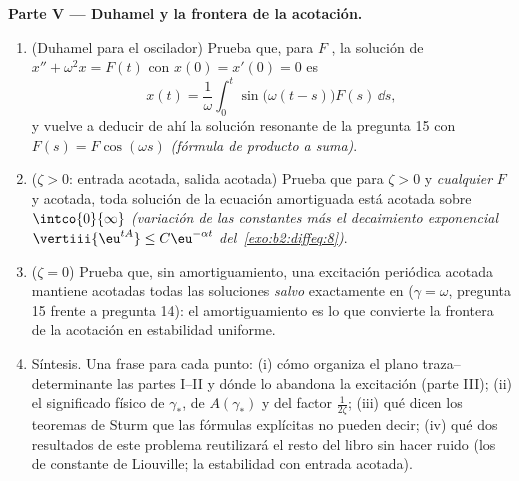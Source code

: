 \begin{problem}
\medskip
\noindent\textbf{Parte V --- Duhamel y la frontera de la
acotación.}
\begin{enumerate}[resume]
  \item (Duhamel para el oscilador) Prueba que, para $F$ ,
        la solución de $x'' + \omega^2x = F(t)$ con $x(0) = x'(0) =
        0$ es
        \[
        x(t) = \frac1\omega\int_0^t\sin\bigl(\omega(t -
        s)\bigr)F(s)\,\dd s ,
        \]
        y vuelve a deducir de ahí la solución resonante de la
        pregunta 15 con $F(s) = F\cos(\omega s)$ \emph{(fórmula de
        producto a suma)}.
  \item ($\zeta > 0$: entrada acotada, salida acotada) Prueba que
        para $\zeta > 0$ y \emph{cualquier} $F$  y acotada,
        toda solución de la ecuación amortiguada está acotada sobre
        $\intco{0}{\infty}$ \emph{(variación de las constantes más
        el decaimiento exponencial $\vertiii{\eu^{tA}} \leq
        C\eu^{-\alpha t}$ del~\cref{exo:b2:diffeq:8})}.
  \item ($\zeta = 0$) Prueba que, sin amortiguamiento, una
        excitación periódica acotada mantiene acotadas todas las
        soluciones \emph{salvo} exactamente en  ($\gamma =
        \omega$, pregunta 15 frente a pregunta 14): el
        amortiguamiento es lo que convierte la frontera de la
        acotación en estabilidad uniforme.
  \item Síntesis. Una frase para cada punto: (i) cómo organiza el
        plano traza--determinante las partes I--II y dónde lo
        abandona la excitación (parte III); (ii) el significado
        físico de $\gamma_*$, de $A(\gamma_*)$ y del factor
        $\frac1{2\zeta}$; (iii) qué dicen los teoremas de Sturm que
        las fórmulas explícitas no pueden decir; (iv) qué dos
        resultados de este problema reutilizará el resto del libro
        sin hacer ruido (los  de constante de Liouville;
        la estabilidad con entrada acotada).
\end{enumerate}
\end{problem}
